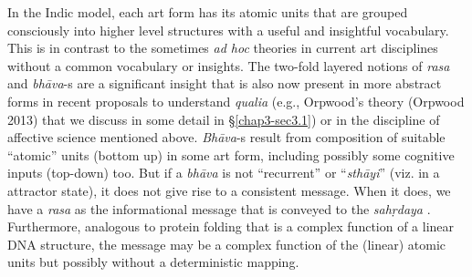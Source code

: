 In the Indic model, each art form has its atomic units that are grouped consciously into higher level structures with a useful and insightful vocabulary. This is in contrast to the sometimes \textsl{ad hoc} theories in current art disciplines without a common vocabulary or insights. The two-fold layered notions of \textsl{rasa} and \textsl{bhāva}-s are a significant insight that is also now present in more abstract forms in recent proposals to understand \textsl{qualia} (e.g., Orpwood’s theory (Orpwood 2013) that we discuss in some detail in \S\ref{chap3-sec3.1}) or in the discipline of affective science mentioned above. \textsl{Bhāva}-s result from composition of suitable “atomic” units (bottom up) in some art form, including possibly some cognitive inputs (top-down) too. But if a \textsl{bhāva} is not “recurrent” or “\textsl{sthāyi}” (viz. in a attractor state), it does not give rise to a consistent message. When it does, we have a \textsl{rasa} as the informational message that is conveyed to the \textsl{sahṛdaya}
. Furthermore, analogous to protein folding that is a complex function of a linear DNA structure, the message may be a complex function of the (linear) atomic units but possibly without a deterministic mapping.

